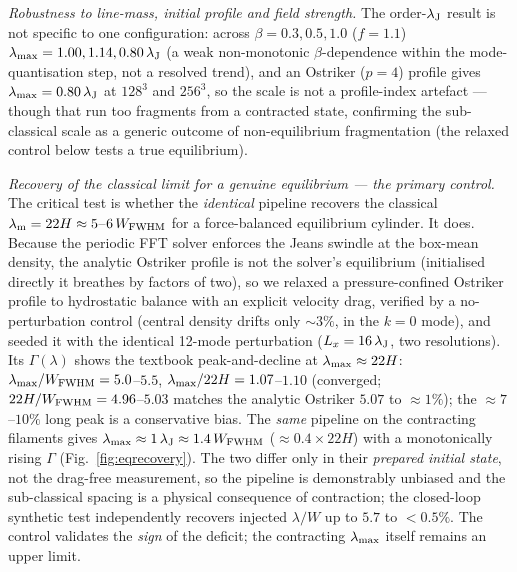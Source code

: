 \documentclass[usenatbib,twoside,twocolumn]{mnras}
\begin{document}
\emph{Robustness to line-mass, initial profile and field strength.} The order-$\lambda_{\rm J}$ result is not specific to one configuration: across $\beta=0.3,0.5,1.0$ ($f=1.1$) $\lambda_{\rm max}=1.00,1.14,0.80\,\lambda_{\rm J}$ (a weak non-monotonic $\beta$-dependence within the mode-quantisation step, not a resolved trend), and an Ostriker ($p=4$) profile gives $\lambda_{\rm max}=0.80\,\lambda_{\rm J}$ at $128^3$ and $256^3$, so the scale is not a profile-index artefact --- though that run too fragments from a contracted state, confirming the sub-classical scale as a generic outcome of non-equilibrium fragmentation (the relaxed control below tests a true equilibrium).

\emph{Recovery of the classical limit for a genuine equilibrium --- the primary control.} The critical test is whether the \emph{identical} pipeline recovers the classical $\lambda_{\rm m}=22H\approx5$--$6\,W_{\rm FWHM}$ for a force-balanced equilibrium cylinder. It does. Because the periodic FFT solver enforces the Jeans swindle at the box-mean density, the analytic Ostriker profile is not the solver's equilibrium (initialised directly it breathes by factors of two), so we relaxed a pressure-confined Ostriker profile to hydrostatic balance with an explicit velocity drag, verified by a no-perturbation control (central density drifts only $\sim3\%$, in the $k=0$ mode), and seeded it with the identical 12-mode perturbation ($L_x=16\,\lambda_{\rm J}$, two resolutions). Its $\Gamma(\lambda)$ shows the textbook peak-and-decline at $\lambda_{\rm max}\approx22H$: $\lambda_{\rm max}/W_{\rm FWHM}=5.0$--$5.5$, $\lambda_{\rm max}/22H=1.07$--$1.10$ (converged; $22H/W_{\rm FWHM}=4.96$--$5.03$ matches the analytic Ostriker $5.07$ to $\approx1\%$); the $\approx7$--$10\%$ long peak is a conservative bias. The \emph{same} pipeline on the contracting filaments gives $\lambda_{\rm max}\approx1\,\lambda_{\rm J}\approx1.4\,W_{\rm FWHM}$ ($\approx0.4\times22H$) with a monotonically rising $\Gamma$ (Fig.~\ref{fig:eqrecovery}). The two differ only in their \emph{prepared initial state}, not the drag-free measurement, so the pipeline is demonstrably unbiased and the sub-classical spacing is a physical consequence of contraction; the closed-loop synthetic test independently recovers injected $\lambda/W$ up to $5.7$ to $<0.5\%$. The control validates the \emph{sign} of the deficit; the contracting $\lambda_{\rm max}$ itself remains an upper limit.
\end{document}
